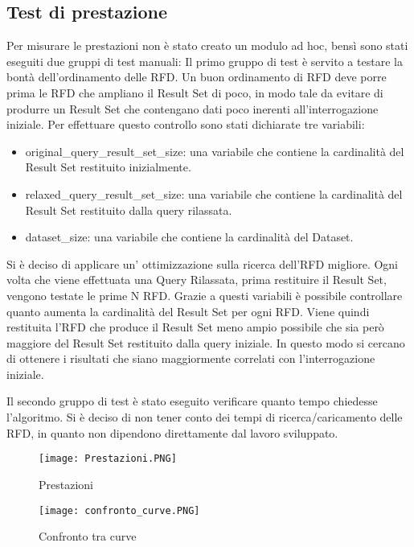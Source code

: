 \subsection{Test di prestazione}
Per misurare le prestazioni non è stato creato un modulo ad hoc, bensì sono stati eseguiti due gruppi di test manuali:
Il primo gruppo di test è servito a testare la bontà dell'ordinamento delle RFD. 
Un buon ordinamento di RFD deve porre prima le RFD che ampliano il Result Set di poco,
in modo tale da evitare di produrre un Result Set che contengano dati poco inerenti all'interrogazione iniziale.
Per effettuare questo controllo sono stati dichiarate tre variabili:
\begin{itemize}
    \item original{\_}query{\_}result{\_}set{\_}size: una variabile che contiene la cardinalità del Result Set restituito inizialmente.
    \item relaxed{\_}query{\_}result{\_}set{\_}size: una variabile che contiene la cardinalità del Result Set restituito dalla query rilassata.
    \item dataset{\_}size: una variabile che contiene la cardinalità del Dataset.
\end{itemize}
Si è deciso di applicare un' ottimizzazione sulla ricerca dell'RFD migliore. 
Ogni volta che viene effettuata una Query Rilassata, prima restituire il Result Set, vengono testate le prime N RFD.
Grazie a questi variabili è possibile controllare quanto aumenta la cardinalità del Result Set per ogni RFD. Viene quindi restituita l'RFD che produce il Result Set meno ampio possibile che sia però maggiore del Result Set restituito dalla query iniziale. In questo modo si cercano di ottenere i risultati che siano maggiormente correlati con l'interrogazione iniziale.

Il secondo gruppo di test è stato eseguito verificare quanto tempo chiedesse l'algoritmo.
Si è deciso di non tener conto dei tempi di ricerca/caricamento delle RFD, in quanto non dipendono direttamente dal lavoro sviluppato.

\begin{figure}[H]
    \centering
    \texttt{[image: Prestazioni.PNG]}
    \caption{Prestazioni}
    \label{fig:prestazioni}
\end{figure}

\begin{figure}[H]
    \centering
    \texttt{[image: confronto\_curve.PNG]}
    \caption{Confronto tra curve}
    \label{fig:confronto_curve}
\end{figure}

